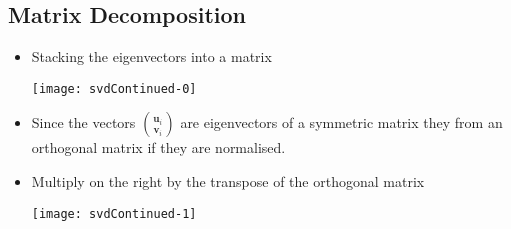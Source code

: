 \begin{slide}
\section[-2]{Matrix Decomposition}

\begin{PauseHighLight}\squeeze
  \begin{itemize}
  \item Stacking the eigenvectors into a matrix
    \vspace*{-5mm}
    \begin{center}
      \texttt{[image: svdContinued-0]}\pause
    \end{center}
    \vspace*{-5mm}
  \item Since the vectors $\binom{\bm{u}_i}{\bm{v}_i}$ are
    eigenvectors of a symmetric matrix they from an orthogonal matrix
    if they are normalised.\pause
  \item Multiply on the right by the transpose of the orthogonal matrix
    \vspace*{-5mm}
    \begin{center}
      \texttt{[image: svdContinued-1]}\pause
    \end{center}
  \end{itemize}
\end{PauseHighLight}


\end{slide}


